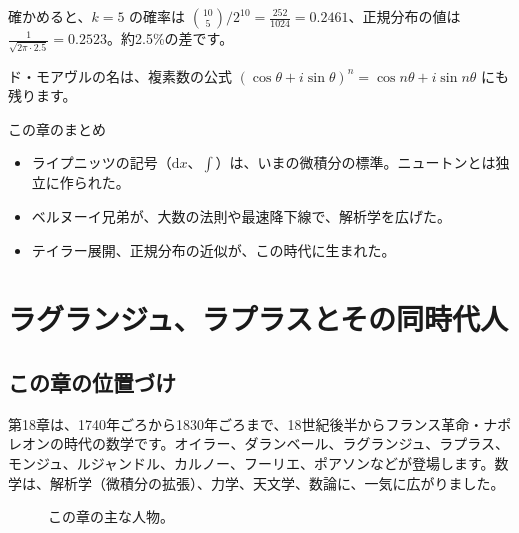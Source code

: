 \documentclass[a4paper,11pt,openany]{ltjsbook}
\newcommand{\dd}{\mathrm{d}}
\begin{document}
確かめると、$k=5$ の確率は $\binom{10}{5}/2^{10}=\tfrac{252}{1024}=0.2461$、正規分布の値は $\tfrac{1}{\sqrt{2\pi\cdot2.5}}=0.2523$。約2.5\%の差です。

ド・モアヴルの名は、複素数の公式 $(\cos\theta+i\sin\theta)^n=\cos n\theta+i\sin n\theta$ にも残ります。

\begin{pointbox}{この章のまとめ}
\begin{itemize}[leftmargin=*]
\item ライプニッツの記号（$\dd x$、$\int$）は、いまの微積分の標準。ニュートンとは独立に作られた。
\item ベルヌーイ兄弟が、大数の法則や最速降下線で、解析学を広げた。
\item テイラー展開、正規分布の近似が、この時代に生まれた。
\end{itemize}
\end{pointbox}

\chapter{ラグランジュ、ラプラスとその同時代人}

\section{この章の位置づけ}

第18章は、1740年ごろから1830年ごろまで、18世紀後半からフランス革命・ナポレオンの時代の数学です。オイラー、ダランベール、ラグランジュ、ラプラス、モンジュ、ルジャンドル、カルノー、フーリエ、ポアソンなどが登場します。数学は、解析学（微積分の拡張）、力学、天文学、数論に、一気に広がりました。

\begin{figure}[htbp]
\centering
{}
\caption{この章の主な人物。}
\end{figure}
\end{document}
